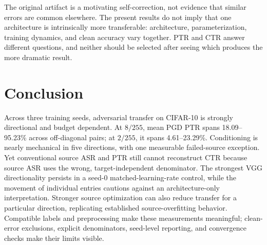 \documentclass[10pt,twocolumn]{article}
\begin{document}
The original artifact is a motivating self-correction, not evidence that similar errors are common elsewhere. The present results do not imply that one architecture is intrinsically more transferable: architecture, parameterization, training dynamics, and clean accuracy vary together. PTR and CTR answer different questions, and neither should be selected after seeing which produces the more dramatic result.

\section{Conclusion}
Across three training seeds, adversarial transfer on CIFAR-10 is strongly directional and budget dependent. At $8/255$, mean PGD PTR spans 18.09--95.23\% across off-diagonal pairs; at $2/255$, it spans 4.61--23.29\%. Conditioning is nearly mechanical in five directions, with one measurable failed-source exception. Yet conventional source ASR and PTR still cannot reconstruct CTR because source ASR uses the wrong, target-independent denominator. The strongest VGG directionality persists in a seed-0 matched-learning-rate control, while the movement of individual entries cautions against an architecture-only interpretation. Stronger source optimization can also reduce transfer for a particular direction, replicating established source-overfitting behavior. Compatible labels and preprocessing make these measurements meaningful; clean-error exclusions, explicit denominators, seed-level reporting, and convergence checks make their limits visible.
\end{document}
